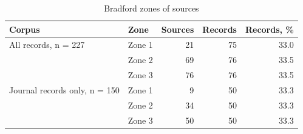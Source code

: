 \begin{table}[!ht]
\caption{Bradford zones of sources}
\centering
\small
\begin{tabular}{@{}llrrr@{}}
\toprule
Corpus & Zone & Sources & Records & Records, \% \\
\midrule
All records, n = 227 & Zone 1 & 21 & 75 & 33.0 \\
 & Zone 2 & 69 & 76 & 33.5 \\
 & Zone 3 & 76 & 76 & 33.5 \\
Journal records only, n = 150 & Zone 1 & 9 & 50 & 33.3 \\
 & Zone 2 & 34 & 50 & 33.3 \\
 & Zone 3 & 50 & 50 & 33.3 \\
\bottomrule
\end{tabular}
\end{table}
